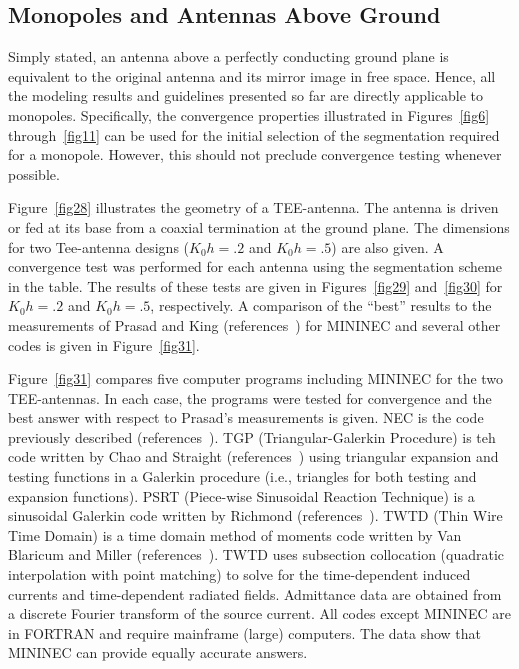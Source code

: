 \documentclass[12pt]{article}
\begin{document}
\subsection{Monopoles and Antennas Above Ground}
\label{sec-monopoles}
Simply stated, an antenna above a perfectly conducting ground plane is
equivalent to the original antenna and its mirror image in free space.
Hence, all the modeling results and guidelines presented so far are
directly applicable to monopoles. Specifically, the convergence
properties illustrated in Figures~\ref{fig6} through~\ref{fig11} can be
used for the initial selection of the segmentation required for a
monopole. However, this should not preclude convergence testing whenever
possible.

Figure~\ref{fig28} illustrates the geometry of a TEE-antenna. The
antenna is driven or fed at its base from a coaxial termination at the
ground plane. The dimensions for two Tee-antenna designs ($K_0 h = .2$
and $K_0 h = .5$) are also given. A convergence test was performed for
each antenna using the segmentation scheme in the table. The results of
these tests are given in Figures~\ref{fig29} and~\ref{fig30} for
$K_0 h = .2$ and $K_0 h = .5$, respectively. A comparison of the
``best'' results to the measurements of Prasad and King
(references~\cite{r18}) for MININEC and several other codes is given in
Figure~\ref{fig31}.

Figure~\ref{fig31} compares five computer programs including MININEC for
the two TEE-antennas. In each case, the programs were tested for
convergence and the best answer with respect to Prasad's measurements is
given. NEC is the code previously described (references~\cite{r4}). TGP
(Triangular-Galerkin Procedure) is teh code written by Chao and Straight
(references~\cite{r11}) using triangular expansion and testing functions
in a Galerkin procedure (i.e., triangles for both testing and expansion
functions). PSRT (Piece-wise Sinusoidal Reaction Technique) is a
sinusoidal Galerkin code written by Richmond (references~\cite{r19}).
TWTD (Thin Wire Time Domain) is a time domain method of moments code
written by Van Blaricum and Miller (references~\cite{r20}). TWTD uses
subsection collocation (quadratic interpolation with point matching) to
solve for the time-dependent induced currents and time-dependent
radiated fields. Admittance data are obtained from a discrete Fourier
transform of the source current. All codes except MININEC are in FORTRAN
and require mainframe (large) computers. The data show that MININEC can
provide equally accurate answers.
\end{document}
